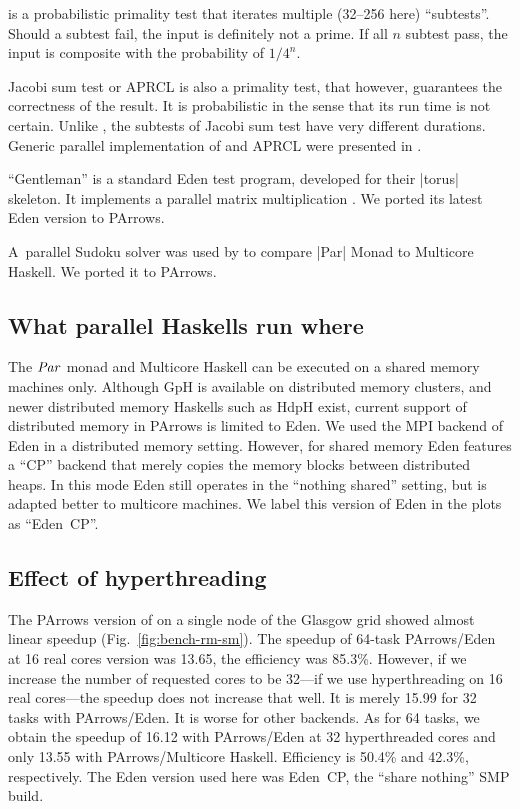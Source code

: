 \rmtest is a probabilistic primality test that iterates multiple (32--256 here)
``subtests''. Should a subtest fail, the input is definitely not a
prime. If all $n$ subtest pass, the input is composite with the
probability of $1/4^{n}$. 

Jacobi sum test or APRCL is also a primality test, that however,
guarantees the correctness of the result. It is probabilistic in the
sense that its run time is not certain. Unlike \rmtest, the subtests
of Jacobi sum test have very different durations. \citet{lobachev-phd}
 Generic parallel
implementation of \rmtest and APRCL were presented in \citet{Lobachev2012}.

``Gentleman'' is a standard Eden test program, developed
for their |torus| skeleton. It implements a parallel matrix
multiplication \citep{Gentleman1978}. We ported its latest Eden
version \citep{Loogen2012} to PArrows.

A~parallel Sudoku solver was used by \citet{par-monad} to compare |Par| Monad
to Multicore Haskell. We ported it to PArrows.



\subsection{What parallel Haskells run where}

The \ensuremath{\Conid{Par}} monad and Multicore Haskell can be executed on a shared
memory machines only. Although GpH is available on distributed memory
clusters, and newer distributed memory Haskells such as HdpH exist,
current support of distributed memory in PArrows is limited to
Eden. We used the MPI backend of Eden in a distributed memory
setting. However, for shared memory Eden features a ``CP'' backend
that merely copies the memory blocks between distributed heaps. In
this mode Eden still operates in the ``nothing shared'' setting, but
is adapted better to multicore machines. We label this version of Eden
in the plots as ``Eden~CP''.



\subsection{Effect of hyperthreading}

The PArrows version of \rmtest on a single node of the Glasgow grid
showed almost linear speedup (Fig.~\ref{fig:bench-rm-sm}). The speedup
of 64-task PArrows/Eden at 16 real cores version was 13.65, the
efficiency was 85.3\%.  However, if we increase the number of
requested cores to be 32---\ie if we use hyperthreading on 16 real
cores---the speedup does not increase that well. It is merely 15.99
for 32 tasks with PArrows/Eden. It is worse for other backends.  As
for 64 tasks, we obtain the speedup of 16.12 with PArrows/Eden at 32
hyperthreaded cores and only 13.55 with PArrows/Multicore
Haskell. Efficiency is 50.4\% and 42.3\%, respectively. The Eden
version used here was Eden~CP, the ``share nothing'' SMP build.

